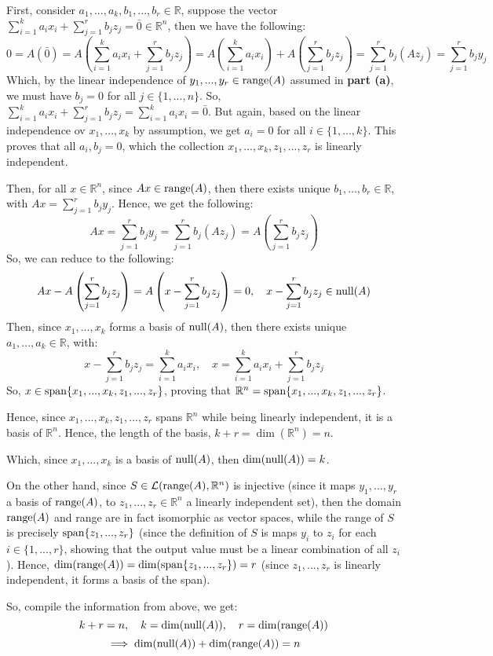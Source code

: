 \documentclass{article}
\begin{document}
\begin{itemize}
    First, consider $a_1,...,a_k,b_1,...,b_r\in\mathbb{R}$, suppose the vector $\sum_{i=1}^{k}a_ix_i+\sum_{j=1}^{r}b_jz_j = \bar{0}\in\mathbb{R}^n$, then we have the following:
    $$0=A(\bar{0})=A\left(\sum_{i=1}^{k}a_ix_i+\sum_{j=1}^{r}b_jz_j\right) = A\left(\sum_{i=1}^{k}a_ix_i\right)+A\left(\sum_{j=1}^{r}b_jz_j\right)=\sum_{j=1}^{r}b_j(Az_j) = \sum_{j=1}^{r}b_jy_j$$
    Which, by the linear independence of $y_1,...,y_r\in\textmd{range}(A)$ assumed in \textbf{part (a)}, we must have $b_j = 0$ for all $j\in\{1,...,n\}$. So, $\sum_{i=1}^{k}a_ix_i+\sum_{j=1}^{r}b_jz_j = \sum_{i=1}^{k}a_ix_i = \bar{0}$. But again, based on the linear independence ov $x_1,...,x_k$ by assumption, we get $a_i=0$ for all $i\in\{1,...,k\}$.
    This proves that all $a_i,b_j = 0$, which the collection $x_1,...,x_k,z_1,...,z_r$ is linearly independent.

    Then, for all $x\in\mathbb{R}^n$, since $Ax \in\textmd{range}(A)$, then there exists unique $b_1,...,b_r\in\mathbb{R}$, with $Ax =\sum_{j=1}^{r}b_jy_j$. Hence, we get the following:
    $$Ax=\sum_{j=1}^{r}b_jy_j=\sum_{j=1}^{r}b_j(Az_j) = A\left(\sum_{j=1}^{r}b_jz_j\right)$$
    So, we can reduce to the following:
    $$Ax-A\left(\sum_{j=1}^{r}b_jz_j\right)=A\left(x-\sum_{j=1}^{r}b_jz_j\right) = 0,\quad x-\sum_{j=1}^{r}b_jz_j\in\textmd{null}(A)$$
    Then, since $x_1,...,x_k$ forms a basis of $\textmd{null}(A)$, then there exists unique $a_1,...,a_k\in\mathbb{R}$, with:
    $$x-\sum_{j=1}^{r}b_jz_j = \sum_{i=1}^{k}a_ix_i,\quad x=\sum_{i=1}^{k}a_ix_i+\sum_{j=1}^{r}b_jz_j$$
    So, $x\in \textmd{span}\{x_1,...,x_k,z_1,...,z_r\}$, proving that $\mathbb{R}^n = \textmd{span}\{x_1,...,x_k,z_1,...,z_r\}$.

    \hfil

    Hence, since $x_1,...,x_k,z_1,...,z_r$ spans $\mathbb{R}^n$ while being linearly independent, it is a basis of $\mathbb{R}^n$. Hence, the length of the basis, $k+r = \dim(\mathbb{R}^n) = n$.

    Which, since $x_1,...,x_k$ is a basis of $\textmd{null}(A)$, then $\dim(\textmd{null}(A)) = k$.
    
    On the other hand, since $S\in\mathcal{L}(\textmd{range}(A),\mathbb{R}^n)$ is injective (since it maps $y_1,...,y_r$ a basis of $\textmd{range}(A)$, to $z_1,...,z_r\in\mathbb{R}^n$ a linearly independent set), then the domain $\textmd{range}(A)$ and range are in fact isomorphic as vector spaces, while the range of $S$ is precisely $\textmd{span}\{z_1,...,z_r\}$ (since the definition of $S$ is maps $y_i$ to $z_i$ for each $i\in\{1,...,r\}$, showing that the output value must be a linear combination of all $z_i$).
    Hence, $\dim(\textmd{range}(A)) = \dim(\textmd{span}\{z_1,...,z_r\}) = r$ (since $z_1,...,z_r$ is linearly independent, it forms a basis of the span).

    So, compile the information from above, we get:
    $$k+r = n,\quad k=\dim(\textmd{null}(A)),\quad r=\dim(\textmd{range}(A))$$
    $$\implies \dim(\textmd{null}(A))+\dim(\textmd{range}(A))=n$$

\end{itemize}
\end{document}
